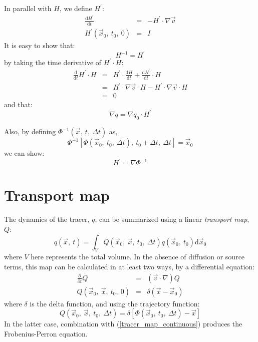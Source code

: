 \documentclass[11pt]{article}
\begin{document}
In parallel with $H$, we define $H^\prime$:
\begin{eqnarray}
\frac{\mathrm d H^\prime}{\mathrm d t} & = & -H^\prime \cdot \nabla \vec v\\
\label{inverse_deformation_matrix}
H^\prime(\vec x_0,~t_0,~0) & = & I
\end{eqnarray}
It is easy to show that:
\begin{equation}
H^{-1}=H^\prime
\end{equation}
by taking the time derivative of $H^\prime \cdot H$:
\begin{eqnarray}
\frac{\mathrm d}{\mathrm d t} H^\prime \cdot H & = & 
		H^\prime \cdot \frac{\mathrm d H}{\mathrm d t} +
		\frac{\mathrm d H^\prime}{\mathrm d t} \cdot H\\
		& = & H^\prime \cdot \nabla \vec v \cdot H 
		- H^\prime \cdot \nabla \vec v \cdot H \\
		& = & 0
\end{eqnarray}
and that:
\begin{equation}
\nabla q = \nabla q_0 \cdot H^\prime
\end{equation}

Also, by defining $\Phi^{-1}(\vec x,~t,~\Delta t)$ as,
\begin{equation}
\Phi^{-1}[\Phi(\vec x_0,~t_0,~\Delta t),~t_0+\Delta t,~\Delta t]=\vec x_0
\end{equation}
we can show:
\begin{equation}
H^\prime=\nabla \Phi^{-1}
\end{equation}

\section{Transport map}

\label{map_section}

The dynamics of the tracer, $q$, can be summarized using a linear
{\it transport map}, $Q$:
\begin{equation}
	q(\vec x,~t)=\int_{V} Q(\vec x_0,~\vec x,~t_0,~\Delta t) q(\vec x_0,~t_0) \mathrm d \vec x_0
\label{tracer_map_continuous}
\end{equation}
where $V$ here represents the total volume.
In the absence of diffusion or source terms, this map can be calculated in
at least two ways, by a differential equation: 
\begin{eqnarray}
	\frac{\partial}{\partial t} Q & = & (\vec v \cdot \nabla) Q 
\label{tracer_map_continuous1}\\
Q(\vec x_0,~\vec x,~t_0,~0) & = & \delta(\vec x-\vec x_0) 
\label{tracer_map_continuous2}
\end{eqnarray}
where $\delta$ is the delta function, and using the trajectory function:
\begin{equation}
Q(\vec x_0,~\vec x,~t_0,~\Delta t) = \delta[\Phi(\vec x_0,~t_0,~\Delta t)-\vec x]
\label{tracer_map_continuous3}
\end{equation}
In the latter case, combination with (\ref{tracer_map_continuous}) produces the
Frobenius-Perron equation. \citep{Ott1993}
\end{document}
